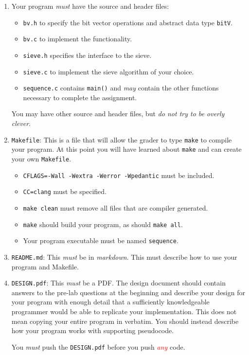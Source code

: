 \documentclass[11pt,twocolumn]{article}
\begin{document}
\begin{enumerate}
    \item Your program \emph{must} have the source and header files:
    \begin{itemize}
        \item \texttt{bv.h} to specify the bit vector operations and abstract
            data type \texttt{bitV}.
        \item \texttt{bv.c} to implement the functionality.
        \item \texttt{sieve.h} specifies the interface to the sieve.
        \item \texttt{sieve.c} to implement the sieve algorithm of your choice.
        \item \texttt{sequence.c} contains \texttt{main()} and \emph{may}
            contain the other functions necessary to complete the assignment.
    \end{itemize}

    You may have other source and header files, but \emph{do not try to be
    overly clever}.

    \item \texttt{Makefile}: This is a file that will allow the grader to type
        \texttt{make} to compile your program. At this point you will have
        learned about \texttt{make} and can create your own \texttt{Makefile}.
    \begin{itemize}
        \item \texttt{CFLAGS=-Wall -Wextra -Werror -Wpedantic} must be included.
        \item \texttt{CC=clang} must be specified.
        \item \texttt{make clean} must remove all files that are compiler
            generated.
        \item \texttt{make} should build your program, as should \texttt{make
            all}.
        \item Your program executable must be named \texttt{sequence}.
    \end{itemize}

    \item \texttt{README.md}: This \emph{must} be in \emph{markdown}. This must
        describe how to use your program and Makefile.

    \item \texttt{DESIGN.pdf}: This \emph{must} be a PDF. The design document
        should contain answers to the pre-lab questions at the beginning and
        describe your design for your program with enough detail that a
        sufficiently knowledgeable programmer would be able to replicate your
        implementation. This does not mean copying your entire program in
        verbatim. You should instead describe how your program works with
        supporting pseudocode.

 You \emph{must} push the \texttt{DESIGN.pdf} before you
          push \textcolor{red}{\emph{any}} code.
\end{enumerate}
\end{document}
